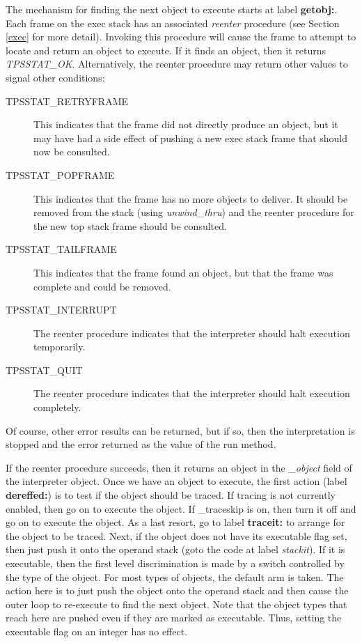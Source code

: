The mechanism for finding the next object
to execute starts at label {\bf getobj:}.
Each frame on the exec stack has an associated {\em reenter}
procedure (see Section \ref{exec} for more detail).
Invoking this procedure will cause the frame to attempt to
locate and return an object to execute.  If it finds an object,
then it returns {\em TPSSTAT\_OK}.
Alternatively, the reenter procedure may return other values
to signal other conditions:
\begin{description}
\item[TPSSTAT\_RETRYFRAME]
This indicates that the frame did not directly produce
an object, but it may have had a side effect of pushing
a new exec stack frame that should now be consulted.
\item[TPSSTAT\_POPFRAME]
This indicates that the frame has no more objects to deliver.
It should be removed from the stack (using {\em unwind\_thru})
and the reenter procedure for the new top stack frame should
be consulted.
\item[TPSSTAT\_TAILFRAME]
This indicates that the frame found an object,
but that the frame was complete and could be removed.
\item[TPSSTAT\_INTERRUPT]
The reenter procedure indicates that the interpreter
should halt execution temporarily.
\item[TPSSTAT\_QUIT]
The reenter procedure indicates that the interpreter
should halt execution completely.
\end{description}
Of course, other error results can be returned, but if so,
then the interpretation is stopped and the error returned
as the value of the run method.

If the reenter procedure succeeds, then it returns an object
in the {\em \_object} field of the interpreter object.
Once we have an object to execute,
the first action (label {\bf dereffed:}) is to test if the object
should be traced.
If tracing is not currently enabled, then go on to execute the object.
If {\_traceskip} is on, then turn it off and go on to execute
the object.  As a last resort, go to label {\bf traceit:} to
arrange for the object to be traced.
Next, if the object does not have
its executable flag set, then just push it onto the operand stack
(goto the code at label {\em stackit}).
If it is executable,
then the first level discrimination is made by a switch controlled
by the type of the object.
For most types of objects, the default arm is taken.
The action here is to just push the object onto the operand
stack and then cause the outer loop to re-execute to find the next
object.  Note that the object types that reach here are pushed
even if they are marked as executable.  Thus, setting the executable
flag on an integer has no effect.

